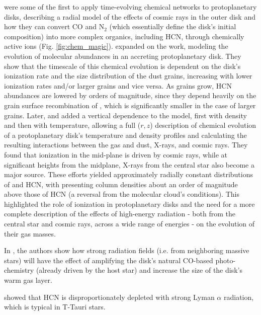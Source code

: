 \citet{Aikawa1997} were some of the first to apply time-evolving chemical networks to protoplanetary disks, describing a radial model of the effects of cosmic rays in the outer disk and how they can convert CO and N$_2$ (which essentially define the disk's initial composition) into more complex organics, including HCN, through chemically active ions (Fig. \ref{fig:chem_magic}). \citet{Aikawa1999} expanded on the work, modeling the evolution of molecular abundances in an accreting protoplanetary disk. They show that the timescale of this chemical evolution is dependent on the disk's ionization rate and the size distribution of the dust grains, increasing with lower ionization rates and/or larger grains and vice versa. As grains grow, HCN abundances are lowered by orders of magnitude, since they depend heavily on the grain surface recombination of \hco, which is significantly smaller in the case of larger grains. Later, \citet{AikawaHerbst1999} and \citet{Aikawa2002} added a vertical dependence to the model, first with density and then with temperature, allowing a full ($r, z$) description of chemical evolution of a protoplanetary disk's temperature and density profiles and calculating the resulting interactions between the gas and dust, X-rays, and cosmic rays. They found that ionization in the mid-plane is driven by cosmic rays, while at significant heights from the midplane, X-rays from the central star also become a major source. These efforts yielded approximately radially constant distributions of \hco and HCN, with \hco presenting column densities about an order of magnitude above those of HCN (a reversal from the molecular cloud's conditions). This highlighted the role of ionization in protoplanetary disks and the need for a more complete description of the effects of high-energy radiation - both from the central star and cosmic rays, across a wide range of energies - on the evolution of their gas masses.



In \citet{Fogel2011}, the authors show how strong radiation fields (i.e. from neighboring massive stars) will have the effect of amplifying the disk's natural CO-based photo-chemistry (already driven by the host star) and increase the size of the disk's warm gas layer.

\citet{Fogel2011} showed that HCN is disproportionately depleted with strong Lyman $\alpha$ radiation, which is typical in T-Tauri stars.


